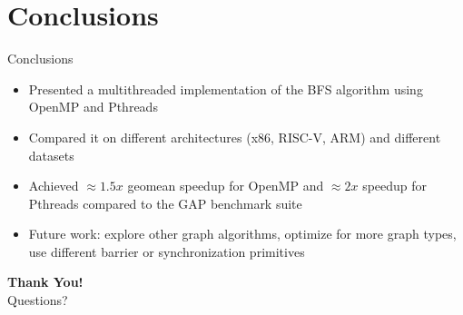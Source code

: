 \section{Conclusions}
\begin{frame}{Conclusions}
\begin{itemize}
  \item Presented a multithreaded implementation of the BFS algorithm using OpenMP and Pthreads
  \item Compared it on different architectures (x86, RISC-V, ARM) and different datasets
  \item Achieved $\approx 1.5x$ geomean speedup for OpenMP and $\approx 2x$ speedup for Pthreads compared to the GAP benchmark suite
  \item Future work: explore other graph algorithms, optimize for more graph types, use different barrier or synchronization primitives
\end{itemize}
\end{frame}

\begin{frame}[plain]
  \centering
  \Huge \textbf{\alert{Thank You!}} \\[1em]
  \Large Questions?
\end{frame}